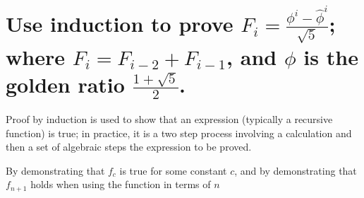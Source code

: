 \section[Problem 2]{Use induction to prove $F_i = \frac{\phi^i - \hat{\phi}^i}{\sqrt{5}}$; where $F_i = F_{i-2} + F_{i-1}$, and $\phi$ is the golden ratio $\frac{1 + \sqrt{5}}{2}$.}

Proof by induction is used to show that an expression (typically a recursive function) is true; in practice, it is a two step process involving a calculation and then a set of algebraic steps the expression to be proved. 

By demonstrating that $f_c$ is true for some constant $c$, and by demonstrating that $f_{n + 1}$ holds when using the function in terms of $n$
